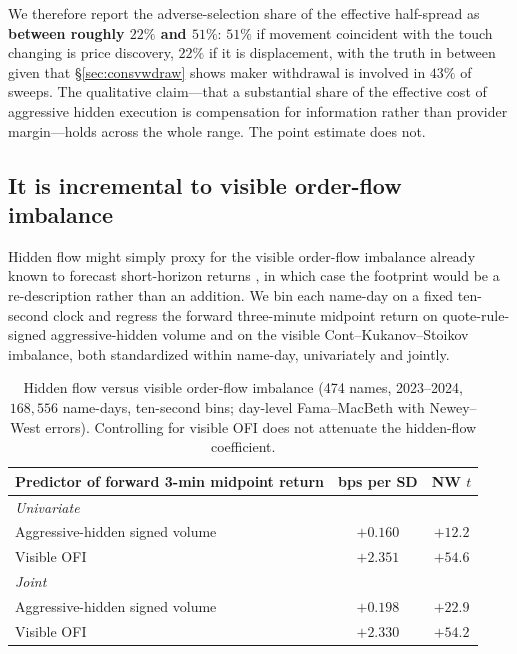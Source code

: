 \documentclass[11pt]{article}
\begin{document}
We therefore report the adverse-selection share of the effective half-spread as
\textbf{between roughly $22\%$ and $51\%$}: $51\%$ if movement coincident with the touch
changing is price discovery, $22\%$ if it is displacement, with the truth in between given
that \S\ref{sec:consvwdraw} shows maker withdrawal is involved in $43\%$ of sweeps. The
qualitative claim---that a substantial share of the effective cost of aggressive hidden
execution is compensation for information rather than provider margin---holds across the
whole range. The point estimate does not.

\subsection{It is incremental to visible order-flow imbalance}
\label{sec:ofi}

Hidden flow might simply proxy for the visible order-flow imbalance already known to
forecast short-horizon returns \citep{cont2014}, in which case the footprint would be a
re-description rather than an addition. We bin each name-day on a fixed ten-second clock
and regress the forward three-minute midpoint return on quote-rule-signed aggressive-hidden
volume and on the visible Cont--Kukanov--Stoikov imbalance, both standardized within
name-day, univariately and jointly.

\begin{table}[htbp]
\centering
\begin{tabular}{lcc}
\toprule
\textbf{Predictor of forward 3-min midpoint return} & \textbf{bps per SD} & \textbf{NW $t$} \\
\midrule
\multicolumn{3}{l}{\emph{Univariate}} \\
\quad Aggressive-hidden signed volume & $+0.160$ & $+12.2$ \\
\quad Visible OFI \citep{cont2014} & $+2.351$ & $+54.6$ \\
\midrule
\multicolumn{3}{l}{\emph{Joint}} \\
\quad Aggressive-hidden signed volume & $+0.198$ & $+22.9$ \\
\quad Visible OFI & $+2.330$ & $+54.2$ \\
\bottomrule
\end{tabular}
\caption{Hidden flow versus visible order-flow imbalance (474 names, 2023--2024,
$168{,}556$ name-days, ten-second bins; day-level Fama--MacBeth with Newey--West errors).
Controlling for visible OFI does not attenuate the hidden-flow coefficient.}
\label{tab:ofi}
\end{table}
\end{document}
